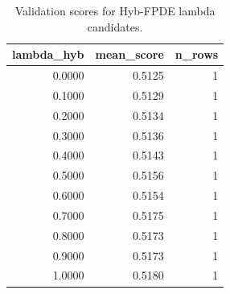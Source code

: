 \begin{table}[t]
\caption{Validation scores for Hyb-FPDE lambda candidates.}
\label{tab:lambda_distribution_computed}
\centering
\begin{tabular}{rrr}
\toprule
lambda\_hyb & mean\_score & n\_rows \\
\midrule
0.0000 & 0.5125 & 1 \\
0.1000 & 0.5129 & 1 \\
0.2000 & 0.5134 & 1 \\
0.3000 & 0.5136 & 1 \\
0.4000 & 0.5143 & 1 \\
0.5000 & 0.5156 & 1 \\
0.6000 & 0.5154 & 1 \\
0.7000 & 0.5175 & 1 \\
0.8000 & 0.5173 & 1 \\
0.9000 & 0.5173 & 1 \\
1.0000 & 0.5180 & 1 \\
\bottomrule
\end{tabular}

\end{table}
